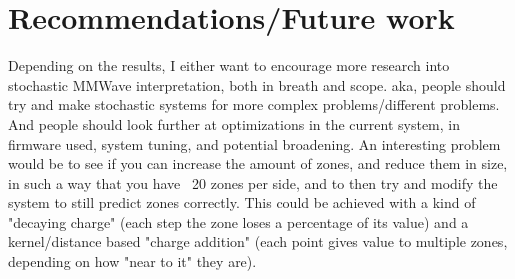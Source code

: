 \section{Recommendations/Future work}
\label{section: conclusion - future work}
Depending on the results, I either want to encourage more research into stochastic MMWave interpretation, both in breath and scope. aka, people should try and make stochastic systems for more complex problems/different problems. And people should look further at optimizations in the current system, in firmware used, system tuning, and potential broadening.
An interesting problem would be to see if you can increase the amount of zones, and reduce them in size, in such a way that you have ~20 zones per side, and to then try and modify the system to still predict zones correctly.
This could be achieved with a kind of "decaying charge" (each step the zone loses a percentage of its value) and a kernel/distance based "charge addition" (each point gives value to multiple zones, depending on how "near to it" they are).
